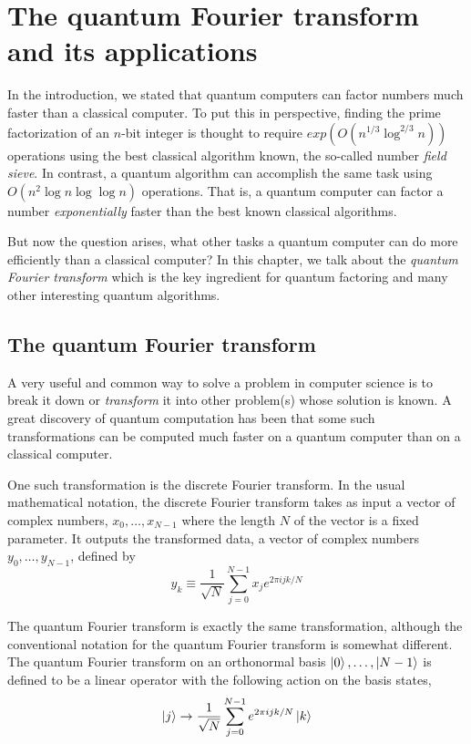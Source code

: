 \section{The quantum Fourier transform and its applications}

In the introduction, we stated that quantum computers can factor numbers much faster than a classical computer. To put this in perspective, finding the prime factorization of an $n$-bit integer is thought to require $exp(O(n^{1/3}\log^{2/3}n))$ operations using the best classical algorithm known, the so-called number \textit{field sieve}. In contrast, a quantum algorithm can accomplish the same task using $O(n^2 \log n \log\log n)$ operations. That is, a quantum computer can factor a number \textit{exponentially} faster than the best known classical algorithms.
\vspace{1em}

But now the question arises, what other tasks a quantum computer can do more efficiently than a classical computer? In this chapter, we talk about the \textit{quantum Fourier transform} which is the key ingredient for quantum factoring and many other interesting quantum algorithms.

\subsection{The quantum Fourier transform}

A very useful and common way to solve a problem in computer science is to break it down or \textit{transform} it into other problem(s) whose solution is known. A great discovery of quantum computation has been that some such transformations can be computed much faster on a quantum computer than on a classical computer.
\vspace{1em}

One such transformation is the discrete Fourier transform. In the usual mathematical notation, the discrete Fourier transform takes as input a vector of complex numbers, $x_0 , \dots , x_{N-1}$ where the length $N$ of the vector is a fixed parameter. It outputs the transformed data, a vector of complex numbers $y_0,\dots,y_{N−1}$, defined by
$$y_k \equiv \frac{1}{\sqrt{N}}\sum_{j=0}^{N-1}{x_j e^{2\pi ijk/N}}$$

The quantum Fourier transform is exactly the same transformation, although the conventional notation for the quantum Fourier transform is somewhat different. The quantum Fourier transform on an orthonormal basis $\ket{0},\dots, \ket{N - 1}$ is defined to be a linear operator with the following action on the basis states,
$$\ket{j} \rightarrow \frac{1}{\sqrt{N}}\sum_{j=0}^{N-1}{e^{2\pi ijk/N}\ket{k}}$$


